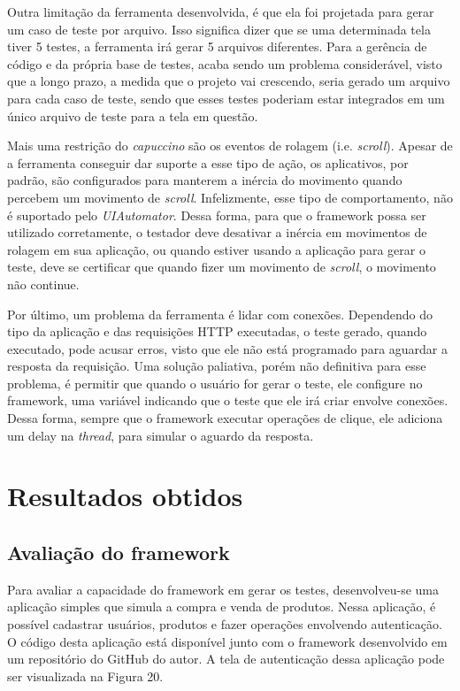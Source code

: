 \documentclass[
    12pt,       %
    openright,      %
    twoside,      %
    a4paper,      %
    english,      %
    french,       %
    spanish,      %
    brazil,       %
    ]{abntex2}
\begin{document}
        Outra limitação da ferramenta desenvolvida, é que ela foi projetada para gerar um caso de teste por
        arquivo. Isso significa dizer que se uma determinada tela tiver 5 testes, a ferramenta irá gerar 5
        arquivos diferentes. Para a gerência de código e da própria base de testes, acaba sendo um problema considerável, visto que a longo prazo, a medida que o projeto vai crescendo, seria gerado um arquivo
        para cada caso de teste, sendo que esses testes poderiam estar integrados em um único arquivo de teste
        para a tela em questão.

        Mais uma restrição do \textit{capuccino} são os eventos de rolagem (i.e. \textit{scroll}). Apesar de
        a ferramenta conseguir dar suporte a esse tipo de ação, os aplicativos, por padrão, são configurados
        para manterem a inércia do movimento quando percebem um movimento de \textit{scroll}. Infelizmente,
        esse tipo de comportamento, não é suportado pelo \textit{UIAutomator}. Dessa forma, para que o framework
        possa ser utilizado corretamente, o testador deve desativar a inércia em movimentos de rolagem em
        sua aplicação, ou quando estiver usando a aplicação para gerar o teste, deve se certificar que quando
        fizer um movimento de \textit{scroll}, o movimento não continue.

        Por último, um problema da ferramenta é lidar com conexões. Dependendo do tipo da aplicação
        e das requisições HTTP executadas, o teste gerado, quando executado, pode acusar erros, visto que ele
        não está programado para aguardar a resposta da requisição. Uma solução paliativa, porém não definitiva
        para esse problema, é permitir que quando o usuário for gerar o teste, ele configure no framework, uma
        variável indicando que o teste que ele irá criar envolve conexões. Dessa forma, sempre que o framework
        executar operações de clique, ele adiciona um delay na \textit{thread}, para simular o aguardo da
        resposta.

  \part{Resultados obtidos}
    \chapter{Avaliação do framework}
      Para avaliar a capacidade do framework em gerar os testes, desenvolveu-se uma aplicação simples que
      simula a compra e venda de produtos. Nessa aplicação, é possível cadastrar usuários, produtos e fazer
      operações envolvendo autenticação. O código desta aplicação está disponível junto com o framework
      desenvolvido em um repositório do GitHub do autor. A tela de autenticação dessa aplicação pode ser
      visualizada na Figura 20.
\end{document}
